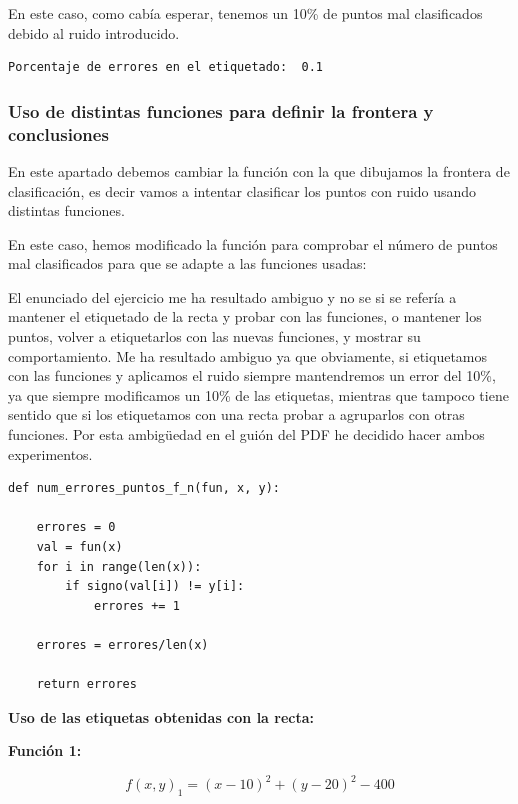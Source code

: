 \documentclass[12pt, spanish]{article}
\begin{document}
En este caso, como cabía esperar, tenemos un 10\% de puntos mal clasificados debido al ruido introducido.

\begin{lstlisting}
Porcentaje de errores en el etiquetado:  0.1
\end{lstlisting}



\subsubsection{Uso de distintas funciones para definir la frontera y conclusiones}

En este apartado debemos cambiar la función con la que dibujamos la frontera de clasificación, es decir vamos a intentar clasificar los puntos con ruido usando distintas funciones.

En este caso, hemos modificado la función para comprobar el número de puntos mal clasificados para que se adapte a las funciones usadas:

El enunciado del ejercicio me ha resultado ambiguo y no se si se refería a mantener el etiquetado de la recta y probar con las funciones, o mantener los puntos, volver a etiquetarlos con las nuevas funciones, y mostrar su comportamiento. Me ha resultado ambiguo ya que obviamente, si etiquetamos con las funciones y aplicamos el ruido siempre mantendremos un error del 10\%, ya que siempre modificamos un 10\% de las etiquetas, mientras que tampoco tiene sentido que si los etiquetamos con una recta probar a agruparlos con otras funciones. Por esta ambigüedad en el guión del PDF he decidido hacer ambos experimentos.

\begin{lstlisting}
def num_errores_puntos_f_n(fun, x, y):

	errores = 0
	val = fun(x)
	for i in range(len(x)):
		if signo(val[i]) != y[i]:
			errores += 1

	errores = errores/len(x)

	return errores
\end{lstlisting}

\newpage

\textbf{Uso de las etiquetas obtenidas con la recta:}

\textbf{Función 1:} 

$$ f(x, y)_1 = (x - 10)^2 + (y - 20)^2 - 400  $$
\end{document}

